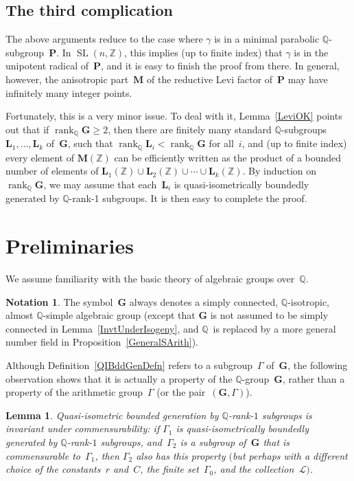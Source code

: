 \documentclass[pdftex]{sigma}
\newcommand{\QQ}{\mathbb{Q}}
\newcommand{\ZZ}{\mathbb{Z}}
\newcommand{\Ga}{\mathbf{G}}
\newcommand{\La}{\mathbf{L}}
\newcommand{\Ma}{\mathbf{M}}
\newcommand{\Pa}{\mathbf{P}}
\DeclareMathOperator{\rank}{rank}
\DeclareMathOperator{\SL}{SL}
\newcommand{\subgroups}{\mathcal{L}}
\numberwithin{equation}{section}
\newtheorem{lem}[thm]{Lemma}
\theoremstyle{definition}
\newtheorem{notation}[thm]{Notation}
\begin{document}
\subsection*{The third complication}
The above arguments reduce to the case where $\gamma$ is in a minimal parabolic $\QQ$-subgroup~$\Pa$. In $\SL(n,\ZZ)$, this implies (up to finite index) that $\gamma$ is in the unipotent radical of~$\Pa$, and it is easy to finish the proof from there. In general, however, the anisotropic part~$\Ma$ of the reductive Levi factor of~$\Pa$ may have infinitely many integer points.

Fortunately, this is a very minor issue. To deal with it, Lemma~\ref{LeviOK} points out that if $\rank_\QQ \Ga \ge 2$, then there are finitely many standard $\QQ$-subgroups $\La_1,\ldots,\La_k$ of~$\Ga$, such that $\rank_\QQ \La_i < \rank_\QQ \Ga$ for all~$i$, and (up to finite index) every element of $\Ma(\ZZ)$ can be efficiently written as the product of a bounded number of elements of $\La_1(\ZZ) \cup \La_2(\ZZ) \cup\cdots \cup \La_k(\ZZ)$. By induction on $\rank_\QQ \Ga$, we may assume that each~$\La_i$ is quasi-isometrically boundedly generated by $\QQ$-rank-1 subgroups. It is then easy to complete the proof.

\section{Preliminaries}

 We assume familiarity with the basic theory of algebraic groups over~$\QQ$.

 \begin{notation} \label{GaNotation} The symbol~$\Ga$ always denotes a simply connected, $\QQ$-isotropic, almost $\QQ$-simple algebraic group (except that $\Ga$ is not assumed to be simply connected in Lemma~\ref{InvtUnderIsogeny}, and $\QQ$~is replaced by a more general number field in Proposition~\ref{GeneralSArith}).
 \end{notation}

Although Definition~\ref{QIBddGenDefn} refers to a subgroup~$\Gamma$ of~$\Ga$, the following observation shows that it is actually a property of the $\QQ$-group~$\Ga$, rather than a property of the arithmetic group~$\Gamma$ (or the pair~$(\Ga,\Gamma)$).

\begin{lem} \label{BddCommensurable}\sloppy
Quasi-isometric bounded generation by $\QQ$-rank-$1$ subgroups is invariant under commensurability:
if $\Gamma_1$ is quasi-isometrically boundedly generated by $\QQ$-rank-$1$ subgroups, and~$\Gamma_2$ is a subgroup of~$\Ga$ that is commensurable to~$\Gamma_1$, then $\Gamma_2$ also has this property $($but perhaps with a different choice of the constants~$r$ and~$C$, the finite set~$\Gamma_0$, and the collection~$\subgroups)$.
\end{lem}
\end{document}
